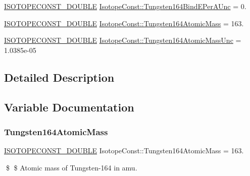 \begin{DoxyCompactItemize}
\mbox{\hyperlink{group___isotope_const-_macros_ga8f45a7272ce02c0b4c65c44636ed719a}{I\+S\+O\+T\+O\+P\+E\+C\+O\+N\+S\+T\+\_\+\+D\+O\+U\+B\+LE}} \mbox{\hyperlink{group___isotope_const-_tungsten-_w164_ga7075638118b387a7e746304d2749e3c0}{Isotope\+Const\+::\+Tungsten164\+Bind\+E\+Per\+A\+Unc}} = 0.
\item 
\mbox{\hyperlink{group___isotope_const-_macros_ga8f45a7272ce02c0b4c65c44636ed719a}{I\+S\+O\+T\+O\+P\+E\+C\+O\+N\+S\+T\+\_\+\+D\+O\+U\+B\+LE}} \mbox{\hyperlink{group___isotope_const-_tungsten-_w164_ga62c1917215459c83b8ce685154257c5c}{Isotope\+Const\+::\+Tungsten164\+Atomic\+Mass}} = 163.
\item 
\mbox{\hyperlink{group___isotope_const-_macros_ga8f45a7272ce02c0b4c65c44636ed719a}{I\+S\+O\+T\+O\+P\+E\+C\+O\+N\+S\+T\+\_\+\+D\+O\+U\+B\+LE}} \mbox{\hyperlink{group___isotope_const-_tungsten-_w164_ga5926ebae8d7ce8c1decc30727afcc158}{Isotope\+Const\+::\+Tungsten164\+Atomic\+Mass\+Unc}} = 1.\+0385e-\/05
\end{DoxyCompactItemize}


\subsection{Detailed Description}


\subsection{Variable Documentation}
\mbox{\label{group___isotope_const-_tungsten-_w164_ga62c1917215459c83b8ce685154257c5c}} 
\subsubsection{\texorpdfstring{Tungsten164\+Atomic\+Mass}{Tungsten164AtomicMass}}
{\footnotesize\ttfamily \mbox{\hyperlink{group___isotope_const-_macros_ga8f45a7272ce02c0b4c65c44636ed719a}{I\+S\+O\+T\+O\+P\+E\+C\+O\+N\+S\+T\+\_\+\+D\+O\+U\+B\+LE}} Isotope\+Const\+::\+Tungsten164\+Atomic\+Mass = 163.}

\$ \$ Atomic mass of Tungsten-\/164 in amu. \mbox{\label{group___isotope_const-_tungsten-_w164_ga5926ebae8d7ce8c1decc30727afcc158}} 

